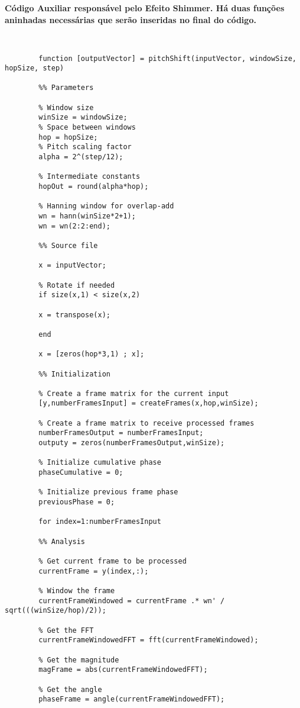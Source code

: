 \textbf{Código Auxiliar responsável pelo Efeito Shimmer. Há duas funções aninhadas necessárias que serão inseridas no final do código.}
	
	\begin{lstlisting}[caption={Code: "pitchshifting.m":Código Matlab da função auxiliar responsável pelo pitch-shifter},label={codigo02}]
		
		
		function [outputVector] = pitchShift(inputVector, windowSize, hopSize, step)
		
		%% Parameters
		
		% Window size
		winSize = windowSize;
		% Space between windows
		hop = hopSize;
		% Pitch scaling factor
		alpha = 2^(step/12);
		
		% Intermediate constants
		hopOut = round(alpha*hop);
		
		% Hanning window for overlap-add
		wn = hann(winSize*2+1);
		wn = wn(2:2:end);
		
		%% Source file
		
		x = inputVector;
		
		% Rotate if needed
		if size(x,1) < size(x,2)
		
		x = transpose(x);
		
		end
		
		x = [zeros(hop*3,1) ; x];
		
		%% Initialization
		
		% Create a frame matrix for the current input
		[y,numberFramesInput] = createFrames(x,hop,winSize);
		
		% Create a frame matrix to receive processed frames
		numberFramesOutput = numberFramesInput;
		outputy = zeros(numberFramesOutput,winSize);
		
		% Initialize cumulative phase
		phaseCumulative = 0;
		
		% Initialize previous frame phase
		previousPhase = 0;
		
		for index=1:numberFramesInput
		
		%% Analysis
		
		% Get current frame to be processed
		currentFrame = y(index,:);
		
		% Window the frame
		currentFrameWindowed = currentFrame .* wn' / sqrt(((winSize/hop)/2));
		
		% Get the FFT
		currentFrameWindowedFFT = fft(currentFrameWindowed);
		
		% Get the magnitude
		magFrame = abs(currentFrameWindowedFFT);
		
		% Get the angle
		phaseFrame = angle(currentFrameWindowedFFT);
		

\end{lstlisting}

